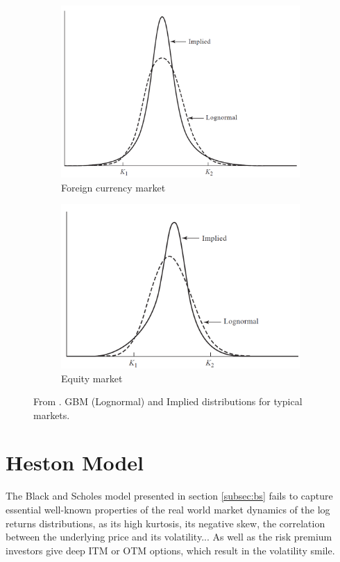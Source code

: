\documentclass[12,twoside]{mammeTFM}
\theoremstyle{definition}
\theoremstyle{remark}
\begin{document}
\begin{figure}
\centering
\begin{subfigure}{.5\textwidth}
  \centering
  \includegraphics[width=.8\linewidth]{Media/currency_distribution.PNG}
  \caption{Foreign currency market}
\end{subfigure}%
\begin{subfigure}{.5\textwidth}
  \centering
  \includegraphics[width=.9\linewidth]{Media/equity_distribution.PNG}
  \caption{Equity market}
\end{subfigure}
\caption{From \cite{hul09}. GBM (Lognormal) and Implied distributions for typical markets.}
\label{fig:implied_distribution}
\end{figure}

\section{Heston Model} \label{chap:heston_model}

The Black and Scholes model presented in section \ref{subsec:bs} fails to capture essential well-known properties of the real world market dynamics of the log returns distributions, as its high kurtosis, its negative skew, the correlation between the underlying price and its volatility... As well as the risk premium investors give deep ITM or OTM options, which result in the volatility smile.
\end{document}
